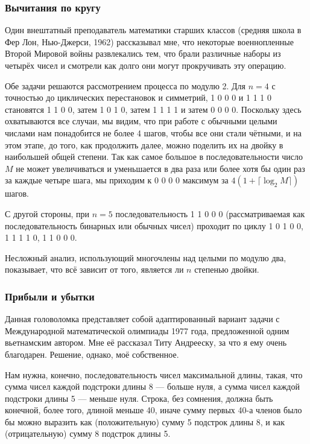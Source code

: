 \subsubsection*{Вычитания по кругу}%

{\sloppy 
Один внештатный преподаватель математики старших классов (средняя школа в Фер Лон, Нью-Джерси, 1962)
рассказывал мне,
что некоторые военнопленные Второй Мировой войны развлекались тем, что брали различные наборы из четырёх чисел и смотрели как долго они могут прокручивать эту операцию.

}

\medskip

Обе задачи решаются рассмотрением процесса по модулю 2.
Для $n=4$ с точностью до циклических перестановок и симметрий,
1 0 0 0 
и
1 1 1 0 становятся 
1 1 0 0, затем 
1 0 1 0, затем 
1 1 1 1 и затем 
0 0 0 0.
Поскольку здесь охватываются все случаи, мы видим, что при работе с обычными целыми числами нам понадобится не более 4 шагов, чтобы все они стали чётными, и на этом этапе, до того, как продолжить далее, можно поделить их на двойку в наибольшей общей степени.
Так как самое большое в последовательности число $M$ не может увеличиваться и уменьшается в два раза или более хотя бы один раз за каждые четыре шага, 
мы приходим к 
0 0 0 0 
максимум за $4(1+\lceil\log_2 M\rceil)$ шагов.

С другой стороны, при $n=5$ последовательность 
1 1 0 0 0
(рассматриваемая как последовательность бинарных или обычных чисел)
проходит по циклу 
1 0 1 0 0, 
1 1 1 1 0, 
1 1 0 0 0.\heart 

Несложный анализ, использующий многочлены над целыми по модулю два, показывает, что всё зависит от того, является ли $n$ степенью двойки.

\subsubsection*{Прибыли и убытки}%

Данная головоломка представляет собой адаптированный вариант задачи с Международной математической олимпиады 1977 года,
предложенной одним вьетнамским автором.
Мне её рассказал Титу Андрееску, %
за что я ему очень благодарен.
Решение, однако, моё собственное.

\medskip

Нам нужна, конечно, последовательность чисел максимальной длины, такая, что сумма чисел каждой подстроки длины 8 --- больше нуля, а сумма чисел каждой подстроки длины 5 --- меньше нуля.
Строка, без сомнения, должна быть конечной, более того, длиной меньше 40, иначе  сумму первых 40-а членов было бы можно выразить как (положительную) сумму 5 подстрок длины 8, и как (отрицательную) сумму 8 подстрок длины 5.

